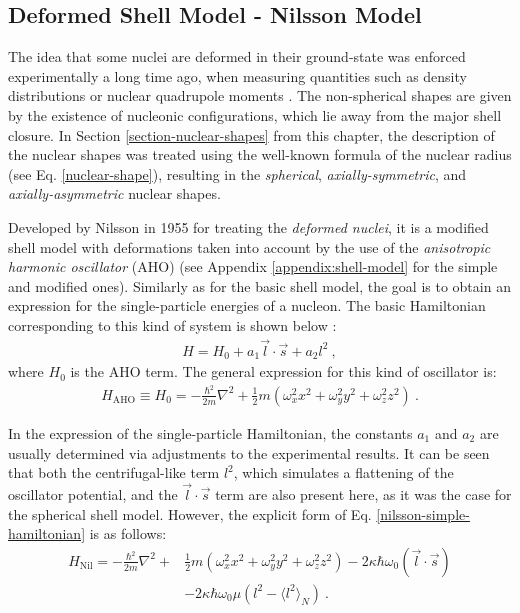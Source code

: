 \subsection{Deformed Shell Model - Nilsson Model}
\label{subsection-nilsson-model}

The idea that some nuclei are deformed in their ground-state was enforced experimentally a long time ago, when measuring quantities such as density distributions or nuclear quadrupole moments \cite{casten2000nuclear}. The non-spherical shapes are given by the existence of nucleonic configurations, which lie away from the major shell closure. In Section \ref{section-nuclear-shapes} from this chapter, the description of the nuclear shapes was treated using the well-known formula of the nuclear radius (see Eq. \eqref{nuclear-shape}), resulting in the \emph{spherical}, \emph{axially-symmetric}, and \emph{axially-asymmetric} nuclear shapes.

Developed by Nilsson in 1955 \cite{nilsson1955binding} for treating the \emph{deformed nuclei}, it is a modified shell model with deformations taken into account by the use of the \emph{anisotropic harmonic oscillator} (AHO) (see Appendix \ref{appendix:shell-model} for the simple and modified ones). Similarly as for the basic shell model, the goal is to obtain an expression for the single-particle energies of a nucleon. The basic Hamiltonian corresponding to this kind of system is shown below \cite{bertulani2007nuclear}:
\begin{align}
    H=H_0+a_1\vec{l}\cdot\vec{s}+a_2l^2\ ,
    \label{nilsson-simple-hamiltonian}
\end{align}
where $H_0$ is the AHO term. The general expression for this kind of oscillator is:
\begin{align}
    H_\text{AHO}\equiv H_0=-\frac{\hbar^2}{2m}\nabla^2+\frac{1}{2}m(\omega_x^2x^2+\omega_y^2y^2+\omega_z^2z^2)\ .
\end{align}

In the expression of the single-particle Hamiltonian, the constants $a_1$ and $a_2$ are usually determined via adjustments to the experimental results. It can be seen that both the centrifugal-like term $l^2$, which simulates a flattening of the oscillator potential, and the $\vec{l}\cdot\vec{s}$ term are also present here, as it was the case for the spherical shell model. However, the explicit form of Eq. \eqref{nilsson-simple-hamiltonian} is as follows:
\begin{align}
    H_\text{Nil}=-\frac{\hbar^2}{2m}\nabla^2+&\frac{1}{2}m(\omega_x^2x^2+\omega_y^2y^2+\omega_z^2z^2)-2\kappa\hbar\omega_0(\vec{l}\cdot\vec{s})\nonumber\\&-2\kappa\hbar\omega_0\mu\left(l^2-\langle l^2\rangle_N\right)\ .
    \label{eq-full-nilsson-ham}
\end{align}

